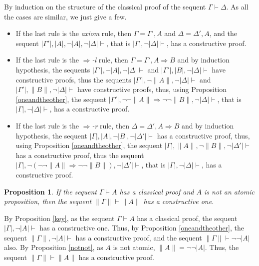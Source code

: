 \documentclass{article}
\newtheorem{proposition}{Proposition}
\begin{document}
By induction 
on the structure of the classical proof of the sequent
$\Gamma \vdash \Delta$. 
As all the cases are similar, we just give a few.

\begin{itemize}

\item If the last rule is the {\em axiom} rule, then $\Gamma =
\Gamma', A$ and $\Delta = \Delta', A$, and the sequent $|\Gamma'|,
|A|, \neg |A|, \neg |\Delta| \vdash$, that is $|\Gamma|, \neg
|\Delta| \vdash$, has a constructive proof.

\item If the last rule is the {\em $\Rightarrow$-l} rule, then
$\Gamma = \Gamma', A \Rightarrow B$ and by induction hypothesis,
the sequents $|\Gamma'|, \neg |A|, \neg |\Delta| \vdash$ and
$|\Gamma'|, |B|, \neg |\Delta| \vdash$ have constructive proofs,
thus the sequents $|\Gamma'|, \neg \|A\|, \neg |\Delta| \vdash$ and
$|\Gamma'|, \|B\|, \neg |\Delta| \vdash$ have constructive proofs,
thus, using Proposition \ref{oneandtheother}, 
the sequent $|\Gamma'|, \neg \neg \|A\|
\Rightarrow \neg \neg \|B\|, \neg |\Delta| \vdash$, 
that is
$|\Gamma|, \neg |\Delta| \vdash$, has a constructive proof.

\item If the last rule is the {\em $\Rightarrow$-r} rule, then 
$\Delta = \Delta',  A \Rightarrow B$ and by induction hypothesis, 
the sequent 
$|\Gamma|, |A|, \neg |B|, \neg |\Delta'| \vdash$
has a constructive proof, 
thus, using Proposition \ref{oneandtheother}, the sequent 
$|\Gamma|, \|A\|, \neg \|B\|, \neg |\Delta'| \vdash$
has a constructive proof, 
thus the sequent
$|\Gamma|, \neg (\neg \neg \|A\| \Rightarrow \neg \neg \|B\|), 
\neg |\Delta'| \vdash$,
that is  $|\Gamma|, \neg |\Delta| \vdash$, has a constructive proof.
\end{itemize}

\begin{proposition}\label{nonatom}
If the sequent $\Gamma \vdash A$ has a classical proof and $A$ is not 
an atomic proposition, then 
the sequent $\|\Gamma\| \vdash \|A\|$ has a constructive one.
\end{proposition}

By Proposition \ref{key}, as the sequent $\Gamma \vdash A$ has a 
classical proof, the sequent $|\Gamma|, \neg |A| \vdash$ has a constructive 
one.
Thus, by Proposition \ref{oneandtheother}, the sequent $\|\Gamma\|, \neg |A| \vdash$ 
has a constructive proof, and the sequent 
$\|\Gamma\| \vdash \neg \neg |A|$ 
also.
By Proposition \ref{notnot}, as 
$A$ is not atomic, $\|A\| = \neg \neg |A|$. Thus, the sequent 
$\|\Gamma\| \vdash \|A\|$ has a constructive proof.
\end{document}
